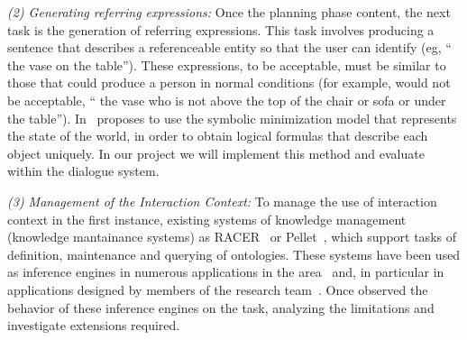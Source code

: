 \emph{(2) Generating referring expressions:} Once the planning phase content,
the next task is the generation of referring expressions. This task involves
producing a sentence that describes a referenceable entity so that the user can
identify (eg, `` the vase on the table''). These expressions, to be acceptable,
must be similar to those that could produce a person in normal conditions (for
example, would not be acceptable, `` the vase who is not above the top of the
chair or sofa or under the table''). In~\cite{AKS08} proposes to use the
symbolic minimization model that represents the state of the world, in order to
obtain logical formulas that describe each object uniquely. In our project we
will implement this method and evaluate within the dialogue system.
% 

\emph{(3) Management of the Interaction Context:} To manage the use of
interaction context in the first instance, existing systems of knowledge
management (knowledge mantainance systems) as RACER~\cite{haar:race99} or
Pellet~\cite{siri:pell06}, which support tasks of definition, maintenance and
querying of ontologies. These systems have been used as inference engines in
numerous applications in the area~\cite{franconi03,koller04} and, in particular
in applications designed by members of the research team~\cite{benotti09b}. Once
observed the behavior of these inference engines on the task, analyzing the
limitations and investigate extensions required.
% 

